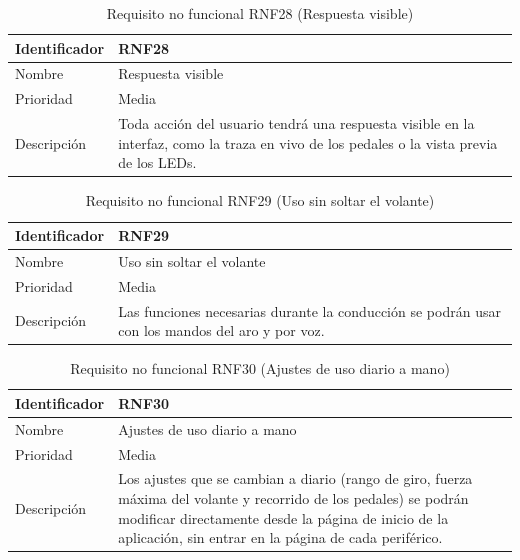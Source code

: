 \begin{table}[H]
	\centering
	\renewcommand{\arraystretch}{2}
	\begin{tabular}{|l|p{10cm}|}
		\hline
		Identificador & RNF28 \\
		\hline
		Nombre & Respuesta visible \\
		\hline
		Prioridad & Media \\
		\hline
		Descripción & Toda acción del usuario tendrá una respuesta visible en la interfaz, como la traza en vivo de los pedales o la vista previa de los LEDs. \\
		\hline
	\end{tabular}
	\caption{Requisito no funcional RNF28 (Respuesta visible)}
	\label{tab:rnf28}
\end{table}

\begin{table}[H]
	\centering
	\renewcommand{\arraystretch}{2}
	\begin{tabular}{|l|p{10cm}|}
		\hline
		Identificador & RNF29 \\
		\hline
		Nombre & Uso sin soltar el volante \\
		\hline
		Prioridad & Media \\
		\hline
		Descripción & Las funciones necesarias durante la conducción se podrán usar con los mandos del aro y por voz. \\
		\hline
	\end{tabular}
	\caption{Requisito no funcional RNF29 (Uso sin soltar el volante)}
	\label{tab:rnf29}
\end{table}

\begin{table}[H]
	\centering
	\renewcommand{\arraystretch}{2}
	\begin{tabular}{|l|p{10cm}|}
		\hline
		Identificador & RNF30 \\
		\hline
		Nombre & Ajustes de uso diario a mano \\
		\hline
		Prioridad & Media \\
		\hline
		Descripción & Los ajustes que se cambian a diario (rango de giro, fuerza máxima del volante y recorrido de los pedales) se podrán modificar directamente desde la página de inicio de la aplicación, sin entrar en la página de cada periférico. \\
		\hline
	\end{tabular}
	\caption{Requisito no funcional RNF30 (Ajustes de uso diario a mano)}
	\label{tab:rnf30}
\end{table}

